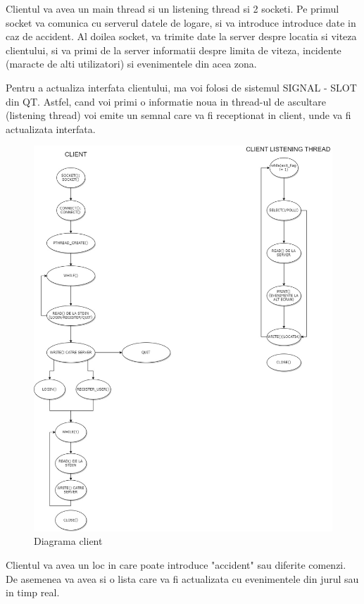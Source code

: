 \documentclass[runningheads]{llncs}
\begin{document}
Clientul va avea un main thread si un listening thread si 2 socketi. Pe primul socket va comunica cu serverul datele de logare, si va introduce introduce date in caz de accident. Al doilea socket, va trimite date la server despre locatia si viteza clientului, si va primi de la server informatii despre limita de viteza, incidente (maracte de alti utilizatori) si evenimentele din acea zona.

Pentru a actualiza interfata clientului, ma voi folosi de sistemul SIGNAL - SLOT din QT. Astfel, cand voi primi o informatie noua in thread-ul de ascultare (listening thread) voi emite un semnal care va fi receptionat in client, unde va fi actualizata interfata.
\begin{figure}[H]
\includegraphics[width=\textwidth]{CLIENT_CLIENT_THREAD.jpg}
\caption{Diagrama client}
\end{figure}
Clientul va avea un loc in care poate introduce "accident" sau diferite comenzi. De asemenea va avea si o lista care va fi actualizata cu evenimentele din jurul sau in timp real.\\
\end{document}
